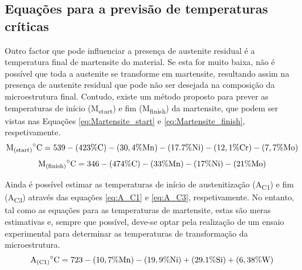 \subsection{Equações para a previsão de temperaturas críticas}\label{ssec:previsao_martensite}
Outro factor que pode influenciar a presença de austenite residual é a temperatura final de martensite do material. Se esta for muito baixa, não é possível que toda a austenite se transforme em martensite, resultando assim na presença de austenite residual que pode não ser desejada na composição da microestrutura final. Contudo, existe um método proposto para prever as temperaturas de início (M\textsubscript{start}) e fim (M\textsubscript{finish}) da martensite, que podem ser vistas nas Equações \ref{eq:Martensite_start} e \ref{eq:Martensite_finish}, respetivamente\cite{Honeycombe1995}.
\begin{equation}
    \label{eq:Martensite_start}
    \mathrm{M\textsubscript{(start)}}^{\circ}\mathrm{C} = 539-(423\%\mathrm{C})-(30,4\%\mathrm{Mn})-(17.7\%\mathrm{Ni})-(12,1\%\mathrm{Cr})-(7,7\%\mathrm{Mo})
\end{equation}
\begin{equation}
    \label{eq:Martensite_finish}
    \mathrm{M\textsubscript{(finish)}}^{\circ}\mathrm{C} = 346 - (474\%\mathrm{C}) - (33\%\mathrm{Mn}) - (17\%\mathrm{Ni}) - (21\%\mathrm{Mo})
\end{equation}
\par
Ainda é possível estimar as temperaturas de início de austenitização (A\textsubscript{C1}) e fim (A\textsubscript{C3}) através das equações \ref{eq:A_C1} e \ref{eq:A_C3}, respetivamente\cite{Platl2020}. No entanto, tal como as equações para as temperaturas de martensite, estas são meras estimativas e, sempre que possível, deve-se optar pela realização de um ensaio experimental para determinar as temperaturas de transformação da microestrutura.
\begin{equation}
    \label{eq:A_C1}
    \mathrm{A\textsubscript{(C1)}}^{\circ}\mathrm{C} = 723 - (10,7\%\mathrm{Mn}) - (19,9\%\mathrm{Ni}) + (29.1\%\mathrm{Si}) + (6,38\%\mathrm{W})
\end{equation}
